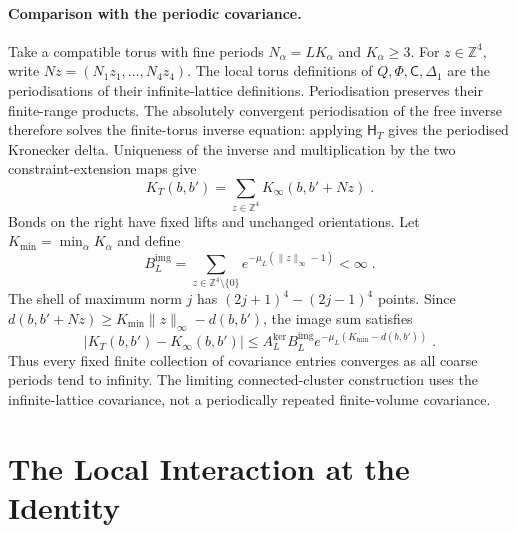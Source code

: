 \documentclass[11pt]{article}
\begin{document}
\paragraph{Comparison with the periodic covariance.}
Take a compatible torus with fine periods $N_\alpha=LK_\alpha$ and $K_\alpha\geq3$. For $z\in\mathbb Z^4$, write $Nz=(N_1z_1,\ldots,N_4z_4)$. The local torus definitions of $Q,\Phi,\mathsf C,\Delta_1$ are the periodisations of their infinite-lattice definitions. Periodisation preserves their finite-range products. The absolutely convergent periodisation of the free inverse therefore solves the finite-torus inverse equation: applying $\mathsf H_T$ gives the periodised Kronecker delta. Uniqueness of the inverse and multiplication by the two constraint-extension maps give
\begin{equation}\label{eq:bulk-periodisation}
    K_T(b,b')=\sum_{z\in\mathbb Z^4}K_\infty(b,b'+Nz)\;.
\end{equation}
Bonds on the right have fixed lifts and unchanged orientations. Let $K_{\min}=\min_\alpha K_\alpha$ and define
\begin{equation}\label{eq:bulk-image-constant}
    B_L^{\mathrm{img}}
        =\sum_{z\in\mathbb Z^4\setminus\{0\}}
            e^{-\mu_L(\|z\|_\infty-1)}<\infty\;.
\end{equation}
The shell of maximum norm $j$ has $(2j+1)^4-(2j-1)^4$ points. Since $d(b,b'+Nz)\geq K_{\min}\|z\|_\infty-d(b,b')$, the image sum satisfies
\begin{equation}\label{eq:bulk-image-error}
    |K_T(b,b')-K_\infty(b,b')|
        \leq A_L^{\mathrm{ker}}B_L^{\mathrm{img}}
            e^{-\mu_L(K_{\min}-d(b,b'))}\;.
\end{equation}
Thus every fixed finite collection of covariance entries converges as all coarse periods tend to infinity. The limiting connected-cluster construction uses the infinite-lattice covariance, not a periodically repeated finite-volume covariance.

\section{The Local Interaction at the Identity}
\label{sec:perimeter-attempt}
\end{document}
